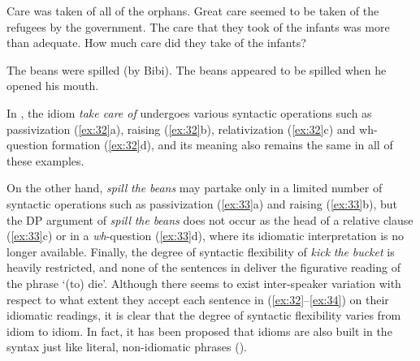 \begin{exe}
\ex\label{ex:32}
    \begin{xlist}
        \ex	Care was taken of all of the orphans.					
    	\ex Great care seemed to be taken of the refugees by the government.
    	\ex The care that they took of the infants was more than adequate.
    	\ex How much care did they take of the infants?
    \end{xlist}
\ex\label{ex:33} \judgewidth{\#}
    \begin{xlist}
        \ex	The beans were spilled (by Bibi).						
    	\ex The beans appeared to be spilled when he opened his mouth.
    \end{xlist}
\ex\label{ex:34}
    \begin{xlist}
    \end{xlist}
\end{exe}
					
In , the idiom \textit{take care of} undergoes various syntactic operations such as passivization (\ref{ex:32}a), raising (\ref{ex:32}b), relativization (\ref{ex:32}c) and wh-question formation (\ref{ex:32}d), and its meaning also remains the same in all of these examples. 

On the other hand, \textit{spill} \textit{the} \textit{beans} may partake only in a limited number of syntactic operations such as passivization (\ref{ex:33}a) and raising (\ref{ex:33}b), but the DP argument of \textit{spill} \textit{the} \textit{beans} does not occur as the head of a relative clause (\ref{ex:33}c) or in a \textit{wh}-question (\ref{ex:33}d), where its idiomatic interpretation is no longer available. Finally, the degree of syntactic flexibility of \textit{kick} \textit{the} \textit{bucket} is heavily restricted, and none of the sentences in  deliver the figurative reading of the phrase ‘(to) die’. Although there seems to exist inter-speaker variation with respect to what extent they accept each sentence in (\ref{ex:32}--\ref{ex:34}) on their idiomatic readings, it is clear that the degree of syntactic flexibility varies from idiom to idiom. In fact, it has been proposed that idioms are also built in the syntax just like literal, non-idiomatic phrases (\citealt{EpsteinSeely2006,Nediger2017}). 

